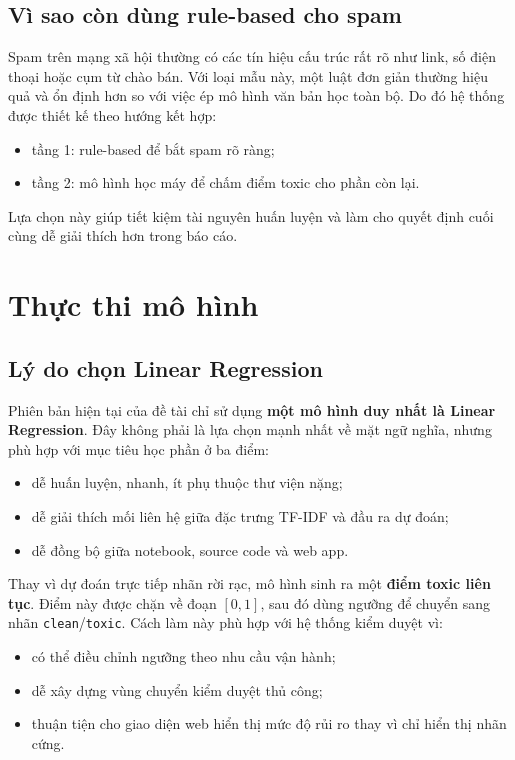 \documentclass[12pt,a4paper]{article}
\begin{document}
\subsection{Vì sao còn dùng rule-based cho spam}
Spam trên mạng xã hội thường có các tín hiệu cấu trúc rất rõ như link, số điện thoại hoặc cụm từ chào bán. Với loại mẫu này, một luật đơn giản thường hiệu quả và ổn định hơn so với việc ép mô hình văn bản học toàn bộ. Do đó hệ thống được thiết kế theo hướng kết hợp:
\begin{itemize}[leftmargin=1.2cm]
    \item tầng 1: rule-based để bắt spam rõ ràng;
    \item tầng 2: mô hình học máy để chấm điểm toxic cho phần còn lại.
\end{itemize}

Lựa chọn này giúp tiết kiệm tài nguyên huấn luyện và làm cho quyết định cuối cùng dễ giải thích hơn trong báo cáo.

\section{Thực thi mô hình}

\subsection{Lý do chọn Linear Regression}
Phiên bản hiện tại của đề tài chỉ sử dụng \textbf{một mô hình duy nhất là Linear Regression}. Đây không phải là lựa chọn mạnh nhất về mặt ngữ nghĩa, nhưng phù hợp với mục tiêu học phần ở ba điểm:
\begin{itemize}[leftmargin=1.2cm]
    \item dễ huấn luyện, nhanh, ít phụ thuộc thư viện nặng;
    \item dễ giải thích mối liên hệ giữa đặc trưng TF-IDF và đầu ra dự đoán;
    \item dễ đồng bộ giữa notebook, source code và web app.
\end{itemize}

Thay vì dự đoán trực tiếp nhãn rời rạc, mô hình sinh ra một \textbf{điểm toxic liên tục}. Điểm này được chặn về đoạn $[0, 1]$, sau đó dùng ngưỡng để chuyển sang nhãn \texttt{clean}/\texttt{toxic}. Cách làm này phù hợp với hệ thống kiểm duyệt vì:
\begin{itemize}[leftmargin=1.2cm]
    \item có thể điều chỉnh ngưỡng theo nhu cầu vận hành;
    \item dễ xây dựng vùng chuyển kiểm duyệt thủ công;
    \item thuận tiện cho giao diện web hiển thị mức độ rủi ro thay vì chỉ hiển thị nhãn cứng.
\end{itemize}
\end{document}
